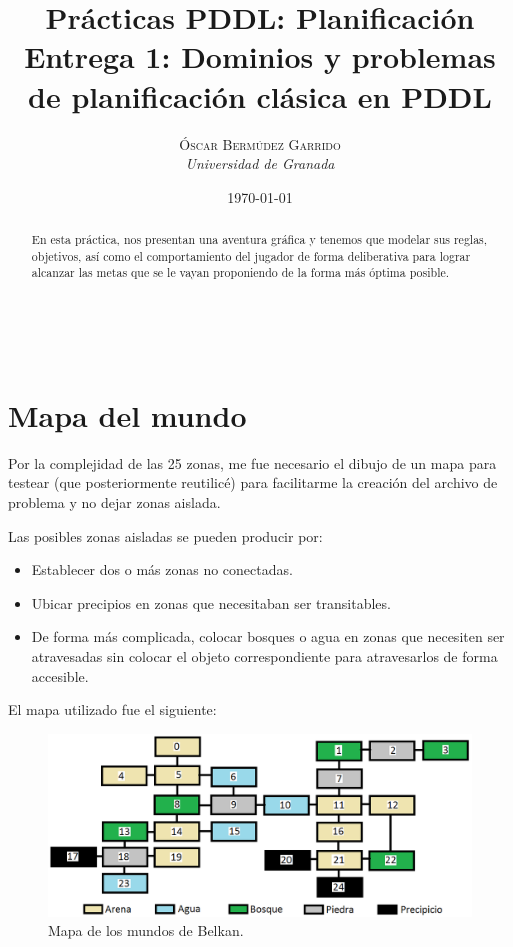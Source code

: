 \documentclass[a4paper, 11pt]{article}
\title{\textbf{Prácticas PDDL: Planificación}\\ %
Entrega 1: Dominios y problemas de planificación clásica en PDDL} %
\author{\textsc{Óscar Bermúdez Garrido} %
\\{\textit{Universidad de Granada}}} %
\date{\today} %
\makeatletter
\renewcommand{\maketitle}{
  \begin{flushright} %
  
  {\LARGE\@title} %
  
  \vspace{50pt} %
  
  {\large\@author} %
  \\\@date %
  \vspace{40pt} %
  \end{flushright}
}
\makeatother
\begin{document}
\maketitle %

\renewcommand{\abstractname}{Resumen} %
\begin{abstract}
	En esta práctica, nos presentan una aventura gráfica y tenemos que modelar sus reglas, objetivos, así
	como el comportamiento del jugador de forma deliberativa para lograr alcanzar las metas que se le vayan
	proponiendo de la forma más óptima posible.
\end{abstract}

{\parskip=2pt
  \tableofcontents
}
\pagebreak


\section{Mapa del mundo}
	Por la complejidad de las 25 zonas, me fue necesario el dibujo de un mapa para testear (que
	posteriormente reutilicé) para facilitarme la creación del archivo de problema y no dejar
	zonas aislada.
	
	Las posibles zonas aisladas se pueden producir por:
	\begin{itemize}
		\item Establecer dos o más zonas no conectadas.
		\item Ubicar precipios en zonas que necesitaban ser transitables.
		\item De forma más complicada, colocar bosques o agua en zonas que necesiten ser atravesadas
		sin colocar el objeto correspondiente para atravesarlos de forma accesible.
	\end{itemize} 
	
	El mapa utilizado fue el siguiente:
	\begin{figure}[H]
		\centering
		\includegraphics[width=15cm]{BelkanWorld.png}
		\caption{Mapa de los mundos de Belkan.}
		\label{world}
	\end{figure}
	
\end{document}
